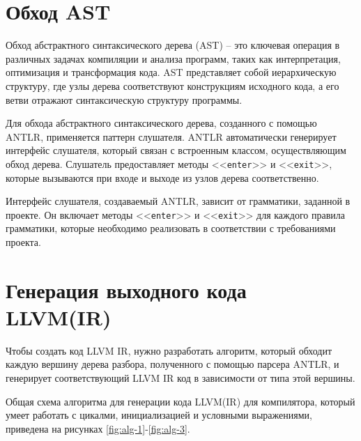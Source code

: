 \clearpage


\section{Обход AST}

Обход абстрактного синтаксического дерева (AST) -- это ключевая операция в различных задачах компиляции и анализа программ, таких как интерпретация, оптимизация и трансформация кода. AST представляет собой иерархическую структуру, где узлы дерева соответствуют конструкциям исходного кода, а его ветви отражают синтаксическую структуру программы.

Для обхода абстрактного синтаксического дерева, созданного с помощью ANTLR, применяется паттерн слушателя. ANTLR автоматически генерирует интерфейс слушателя, который связан с встроенным классом, осуществляющим обход дерева. Слушатель предоставляет методы <<\texttt{enter}>> и <<\texttt{exit}>>, которые вызываются при входе и выходе из узлов дерева соответственно.

Интерфейс слушателя, создаваемый ANTLR, зависит от грамматики, заданной в проекте. Он включает методы <<\texttt{enter}>> и <<\texttt{exit}>> для каждого правила грамматики, которые необходимо реализовать в соответствии с требованиями проекта.


\section{Генерация выходного кода LLVM(IR)}

Чтобы создать код LLVM IR, нужно разработать алгоритм, который обходит каждую вершину дерева разбора, полученного с помощью парсера ANTLR, и генерирует соответствующий LLVM IR код в зависимости от типа этой вершины.

Общая схема алгоритма для генерации кода LLVM(IR) для компилятора, который умеет работать с цикалми, инициализацией и условными выражениями, приведена на рисунках \ref{fig:alg-1}-\ref{fig:alg-3}.

